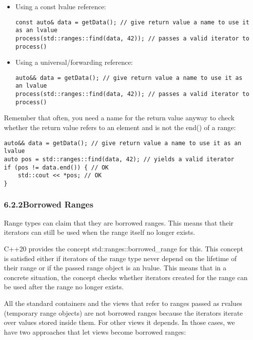 \begin{itemize}
\item
Using a const lvalue reference:

\begin{lstlisting}[style=styleCXX]
const auto& data = getData(); // give return value a name to use it as an lvalue
process(std::ranges::find(data, 42)); // passes a valid iterator to process()
\end{lstlisting}

\item
Using a universal/forwarding reference:

\begin{lstlisting}[style=styleCXX]
auto&& data = getData(); // give return value a name to use it as an lvalue
process(std::ranges::find(data, 42)); // passes a valid iterator to process()
\end{lstlisting}
\end{itemize}

Remember that often, you need a name for the return value anyway to check whether the return value refers to an element and is not the end() of a range:

\begin{lstlisting}[style=styleCXX]
auto&& data = getData(); // give return value a name to use it as an lvalue
auto pos = std::ranges::find(data, 42); // yields a valid iterator
if (pos != data.end()) { // OK
	std::cout << *pos; // OK
}
\end{lstlisting}

\subsubsection*{ 6.2.2\hspace{0.2cm}Borrowed Ranges}

Range types can claim that they are borrowed ranges. This means that their iterators can still be used when the range itself no longer exists.

C++20 provides the concept std::ranges::borrowed\_range for this. This concept is satisfied either if iterators of the range type never depend on the lifetime of their range or if the passed range object is an lvalue. This means that in a concrete situation, the concept checks whether iterators created for the range can be used after the range no longer exists.

All the standard containers and the views that refer to ranges passed as rvalues (temporary range objects) are not borrowed ranges because the iterators iterate over values stored inside them. For other views it depends. In those cases, we have two approaches that let views become borrowed ranges:

